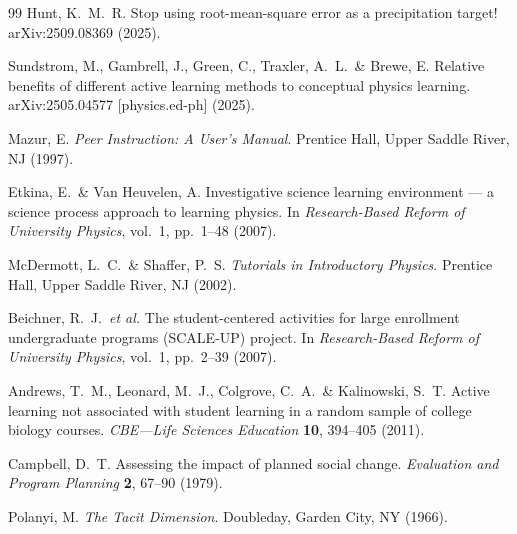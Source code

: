 \documentclass[11pt,a4paper]{article}
\theoremstyle{plain}
\theoremstyle{definition}
\theoremstyle{remark}
\begin{document}
\begin{thebibliography}{99}
Hunt, K.~M.~R.
Stop using root-mean-square error as a precipitation target!
arXiv:2509.08369 (2025).

Sundstrom, M., Gambrell, J., Green, C., Traxler, A.~L.\ \& Brewe, E.
Relative benefits of different active learning methods to conceptual physics
learning.
arXiv:2505.04577 [physics.ed-ph] (2025).

Mazur, E.
\textit{Peer Instruction: A User's Manual}.
Prentice Hall, Upper Saddle River, NJ (1997).

Etkina, E.\ \& Van Heuvelen, A.
Investigative science learning environment --- a science process approach to
learning physics.
In \textit{Research-Based Reform of University Physics}, vol.~1, pp.~1--48
(2007).

McDermott, L.~C.\ \& Shaffer, P.~S.
\textit{Tutorials in Introductory Physics}.
Prentice Hall, Upper Saddle River, NJ (2002).

Beichner, R.~J.\ \textit{et al.}
The student-centered activities for large enrollment undergraduate programs
(SCALE-UP) project.
In \textit{Research-Based Reform of University Physics}, vol.~1, pp.~2--39
(2007).

Andrews, T.~M., Leonard, M.~J., Colgrove, C.~A.\ \& Kalinowski, S.~T.
Active learning not associated with student learning in a random sample of
college biology courses.
\textit{CBE---Life Sciences Education} \textbf{10}, 394--405 (2011).

Campbell, D.~T.
Assessing the impact of planned social change.
\textit{Evaluation and Program Planning} \textbf{2}, 67--90 (1979).

Polanyi, M.
\textit{The Tacit Dimension}.
Doubleday, Garden City, NY (1966).

\end{thebibliography}
\end{document}
